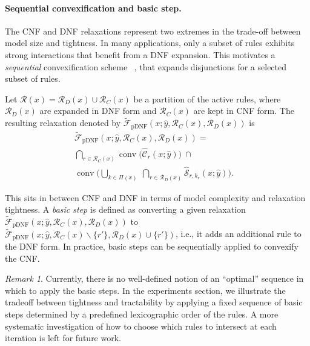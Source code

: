\documentclass{article}
\theoremstyle{plain}
\theoremstyle{definition}
\theoremstyle{remark}
\newtheorem{remark}[theorem]{Remark}
\begin{document}
\paragraph{Sequential convexification and basic step.}
The CNF and DNF relaxations represent two extremes in the trade-off between model size and tightness.
In many applications, only a subset of rules exhibits strong interactions that benefit from a DNF expansion.
This motivates a \emph{sequential} convexification scheme ~\cite{balas2018disjunctive}, that expands disjunctions for a selected subset of rules.

Let $\mathcal{R}(x)=\mathcal{R}_D(x)\cup\mathcal{R}_C(x)$ be a partition of the active rules,
where $\mathcal{R}_D(x)$ are expanded in DNF form and $\mathcal{R}_C(x)$ are kept in CNF form. The resulting relaxation denoted by $\widetilde{\mathcal{F}}_{\mathrm{pDNF}}(x; \hat y,\mathcal{R}_C(x), \mathcal{R}_D(x)   )$ is
\begin{equation}
\begin{aligned}
\widetilde{\mathcal{F}}_{\mathrm{pDNF}}(x; \hat y, \mathcal{R}_C(x), \mathcal{R}_D(x))
= & \\
\bigcap_{r\in\mathcal{R}_C(x)}
\operatorname{conv}\!\big(\widehat{\mathcal{C}}_r(x;\hat y)\big)
\ \cap & \\
\operatorname{conv}\!\Bigg(
\bigcup_{k \in \Pi(x)}
\ \bigcap_{r\in\mathcal{R}_D(x)}
\widehat{\mathcal{S}}_{r,k_r}(x;\hat y)
\Bigg). &
\end{aligned}
\end{equation}

This sits in between CNF and DNF in terms of model complexity and relaxation tightness. A \emph{basic step} is defined as converting a given relaxation
\(\widetilde{\mathcal{F}}_{\mathrm{pDNF}}(x; \hat y, \mathcal{R}_C(x), \mathcal{R}_D(x))\)
to
\(\widetilde{\mathcal{F}}_{\mathrm{pDNF}}(x; \hat y, \mathcal{R}_C(x)\backslash\{r'\}, \mathcal{R}_D(x)\cup\{r'\})\),
i.e., it adds an additional rule to the DNF form. In practice, basic steps can be sequentially applied to convexify the CNF. 
\begin{remark}
    Currently, there is no well-defined notion of an ``optimal'' sequence in which to apply the basic steps. In the experiments section, we illustrate the tradeoff between tightness and tractability by applying a fixed sequence of basic steps determined by a predefined lexicographic order of the rules. A more systematic investigation of how to choose which rules to intersect at each iteration is left for future work.
\end{remark}
\end{document}

